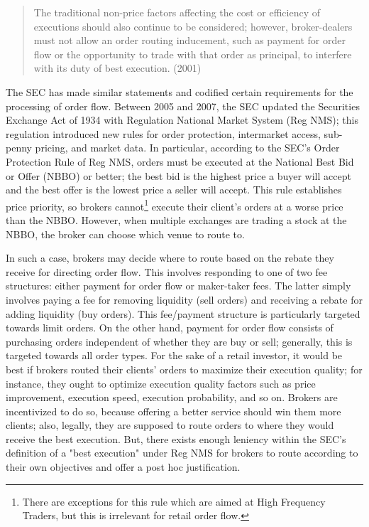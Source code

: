 \documentclass[11pt,a4paper]{article}
\begin{document}
\begin{quote}
	The traditional non-price factors affecting the cost or efficiency of executions should also continue to be considered; however, broker-dealers must not allow an order routing inducement, such as payment for order flow or the opportunity to trade with that order as principal, to interfere with its duty of best execution. (2001)
\end{quote}
The SEC has made similar statements and codified certain requirements for the processing of order flow. Between 2005 and 2007, the SEC updated the Securities Exchange Act of 1934 with Regulation National Market System (Reg NMS); this regulation introduced new rules for order protection, intermarket access, sub-penny pricing, and market data. In particular, according to the SEC's Order Protection Rule of Reg NMS, orders must be executed at the National Best Bid or Offer (NBBO) or better; the best bid is the highest price a buyer will accept and the best offer is the lowest price a seller will accept. This rule establishes price priority, so brokers cannot\footnote{ There are exceptions for this rule which are aimed at High Frequency Traders, but this is irrelevant for retail order flow.} execute their client's orders at a worse price than the NBBO. However, when multiple exchanges are trading a stock at the NBBO, the broker can choose which venue to route to. 

In such a case, brokers may decide where to route based on the rebate they receive for directing order flow. This involves responding to one of two fee structures: either payment for order flow or maker-taker fees. The latter simply involves paying a fee for removing liquidity (sell orders) and receiving a rebate for adding liquidity (buy orders). This fee/payment structure is particularly targeted towards limit orders. On the other hand, payment for order flow consists of purchasing orders independent of whether they are buy or sell; generally, this is targeted towards all order types. 
For the sake of a retail investor, it would be best if brokers routed their clients' orders to maximize their execution quality; 
for instance, they ought to optimize execution quality factors such as price improvement, execution speed, execution probability, and so on. Brokers are incentivized to do so, because offering a better service should win them more clients; also, legally, they are supposed to route orders to where they would receive the best execution. But, there exists enough leniency within the SEC's definition of a "best execution" under Reg NMS for brokers to route according to their own objectives and offer a post hoc justification. 
\end{document}
